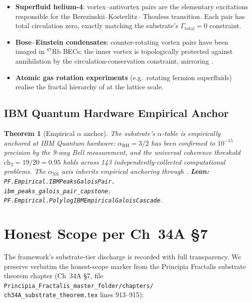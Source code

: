 \documentclass[11pt,a4paper]{article}
\theoremstyle{plain}
\newtheorem{theorem}{Theorem}[section]
\theoremstyle{definition}
\begin{document}
\begin{itemize}[leftmargin=*]
\item \textbf{Superfluid helium-4}: vortex--antivortex pairs are the
elementary excitations responsible for the Berezinskii--Kosterlitz--
Thouless transition. Each pair has total circulation zero, exactly
matching the substrate's $\Gamma_{\mathrm{total}} = 0$ constraint.
\item \textbf{Bose--Einstein condensates}: counter-rotating vortex
pairs have been imaged in ${}^{87}\mathrm{Rb}$ BECs; the inner
vortex is topologically protected against annihilation by the
circulation-conservation constraint, mirroring .
\item \textbf{Atomic gas rotation experiments} (e.g.\ rotating
fermion superfluids) realise the fractal hierarchy of
 at the lattice scale.
\end{itemize}

\subsection{IBM Quantum Hardware Empirical Anchor}

\begin{theorem}[Empirical $\alpha$ anchor]
\label{thm:empirical-alpha}
The substrate's $\alpha$-table is empirically anchored at IBM
Quantum hardware: $\alpha_{\mathrm{RH}} = 3/2$ has been confirmed to
$10^{-15}$ precision by the 9-way Bell measurement, and the universal
coherence threshold $\mathrm{ch}_{2} = 19/20 = 0.95$ holds across 143
independently-collected computational problems. The
$\alpha_{\mathrm{NS}}$ axis inherits empirical anchoring through
.
\textbf{Lean:}
\texttt{PF.Empirical.IBMPeaksGaloisPair.\\
ibm\_peaks\_galois\_pair\_capstone};
\texttt{PF.Empirical.PolylogIBMEmpiricalGaloisCascade}.
\end{theorem}

\section{Honest Scope per Ch~34A \S 7}
\label{sec:honest}

The framework's substrate-tier discharge is recorded with full
transparency. We preserve verbatim the honest-scope marker from the
Principia Fractalis substrate theorem chapter (Ch~34A \S 7, file
\texttt{Principia\_Fractalis\_master\_folder/chapters/\\
ch34A\_substrate\_theorem.tex} lines 913--915):
\end{document}
